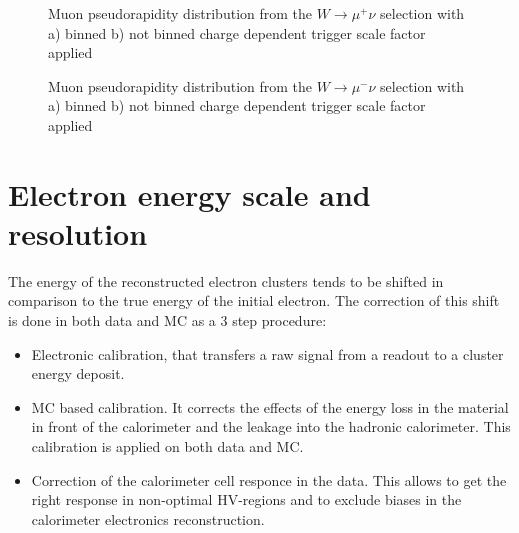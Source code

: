 \begin{figure}[!tbp]
\endminipage\hfill
{}
\endminipage\hfill
\caption{Muon pseudorapidity distribution from the $W\to \mu^+ \nu$ selection with a) binned  b) not binned charge dependent trigger scale factor applied}
\label{fig:SFBined2}
\end{figure}

\begin{figure}[!tbp]
\endminipage\hfill
{}
\endminipage\hfill
\caption{Muon pseudorapidity distribution from the $W\to \mu^- \nu$ selection with a) binned  b) not binned charge dependent trigger scale factor applied}
\label{fig:SFBined3}
\end{figure}

\section{Electron energy scale and resolution}\label{sec:elecScale}
The energy of the reconstructed electron clusters tends to be shifted in comparison to the true energy of the initial electron. The correction of this shift is done in both data and MC as a 3 step procedure\cite{ElecCalib}:
\begin{itemize}
\item Electronic calibration, that transfers a raw signal from a readout to a cluster energy deposit.
\item MC based calibration. It corrects the effects of the energy loss in the material in front of the calorimeter and the leakage into the hadronic calorimeter. This calibration is applied on both data and MC.
\item Correction of the calorimeter cell responce in the data. This allows to get the right response in non-optimal HV-regions and to exclude biases in the calorimeter electronics reconstruction.
\end{itemize}

